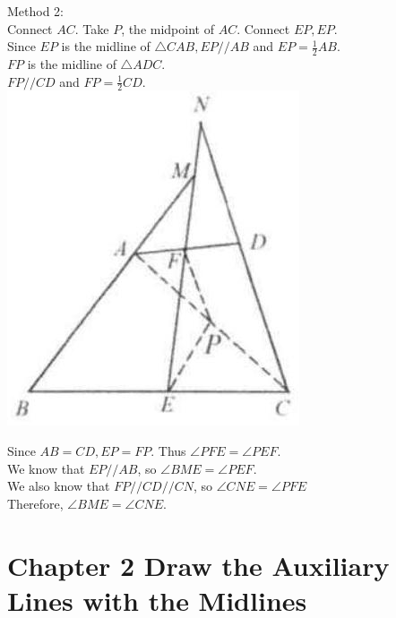 \documentclass[10pt]{article}
\begin{document}
Method 2:\\
Connect \(A C\). Take \(P\), the midpoint of \(A C\). Connect \(E P, E P\).\\
Since \(E P\) is the midline of \(\triangle C A B, E P / / A B\) and \(E P=\frac{1}{2} A B\).\\
\(F P\) is the midline of \(\triangle A D C\).\\
\(F P / / C D\) and \(F P=\frac{1}{2} C D\).\\
\includegraphics[max width=\textwidth, center]{2025_04_17_97bc1f7e44d93c271a88g-043}

Since \(A B=C D, E P=F P\). Thus \(\angle P F E=\angle P E F\).\\
We know that \(E P / / A B\), so \(\angle B M E=\angle P E F\).\\
We also know that \(F P / / C D / / C N\), so \(\angle C N E=\angle P F E\)\\
Therefore, \(\angle B M E=\angle C N E\).

\section*{Chapter 2 Draw the Auxiliary Lines with the Midlines}
\end{document}
